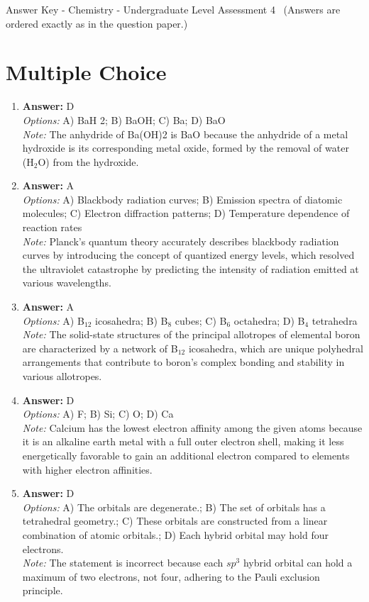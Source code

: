 \documentclass[12pt]{article}
\begin{document}
\begin{center}
Answer Key - Chemistry - Undergraduate Level Assessment 4 \
\small (Answers are ordered exactly as in the question paper.)
\end{center}

\section*{Multiple Choice}
\begin{enumerate}[label=\arabic*.]
\item \textbf{Answer:} D
\\ \textit{Options:} A) BaH 2; B) BaOH; C) Ba; D) BaO
\\ \textit{Note:} The anhydride of Ba(OH)2 is BaO because the anhydride of a metal hydroxide is its corresponding metal oxide, formed by the removal of water (H$_{2}$O) from the hydroxide.
\item \textbf{Answer:} A
\\ \textit{Options:} A) Blackbody radiation curves; B) Emission spectra of diatomic molecules; C) Electron diffraction patterns; D) Temperature dependence of reaction rates
\\ \textit{Note:} Planck's quantum theory accurately describes blackbody radiation curves by introducing the concept of quantized energy levels, which resolved the ultraviolet catastrophe by predicting the intensity of radiation emitted at various wavelengths.
\item \textbf{Answer:} A
\\ \textit{Options:} A) B$_{12}$ icosahedra; B) B$_{8}$ cubes; C) B$_{6}$ octahedra; D) B$_{4}$ tetrahedra
\\ \textit{Note:} The solid-state structures of the principal allotropes of elemental boron are characterized by a network of B$_{12}$ icosahedra, which are unique polyhedral arrangements that contribute to boron's complex bonding and stability in various allotropes.
\item \textbf{Answer:} D
\\ \textit{Options:} A) F; B) Si; C) O; D) Ca
\\ \textit{Note:} Calcium has the lowest electron affinity among the given atoms because it is an alkaline earth metal with a full outer electron shell, making it less energetically favorable to gain an additional electron compared to elements with higher electron affinities.
\item \textbf{Answer:} D
\\ \textit{Options:} A) The orbitals are degenerate.; B) The set of orbitals has a tetrahedral geometry.; C) These orbitals are constructed from a linear combination of atomic orbitals.; D) Each hybrid orbital may hold four electrons.
\\ \textit{Note:} The statement is incorrect because each $sp^3$ hybrid orbital can hold a maximum of two electrons, not four, adhering to the Pauli exclusion principle.
\end{enumerate}
\end{document}
